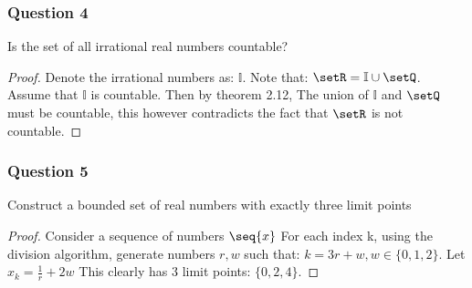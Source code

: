 \documentclass[12pt, letterpaper]{paper}
\begin{document}
\subsubsection{Question 4}
\label{sec:org1135e9c}
\begin{question}
  Is the set of all irrational real numbers countable?
\end{question}
\begin{proof}
  Denote the irrational numbers as: $\mathbb{I}$. Note that:
  $\setR = \mathbb{I} \cup \setQ$. Assume that $\mathbb{I}$ is
  countable. Then by theorem 2.12, The union of $\mathbb{I}$ and
  $\setQ$ must be countable, this however contradicts the fact that
  $\setR$ is not countable.
\end{proof}

\subsubsection{Question 5}
\label{sec:orgc85ac24}
\begin{question}
  Construct a bounded set of real numbers with exactly three limit
  points
\end{question}
\begin{proof}
  Consider a sequence of numbers $\seq{x}$ For each index k, using the
  division algorithm, generate numbers $r,w$ such that:
  $k = 3r + w, w \in \{0,1,2\}$. Let $x_k = \frac{1}{r} + 2w$ This
  clearly has 3 limit points: $\{0,2,4\}$.
\end{proof}
\end{document}
